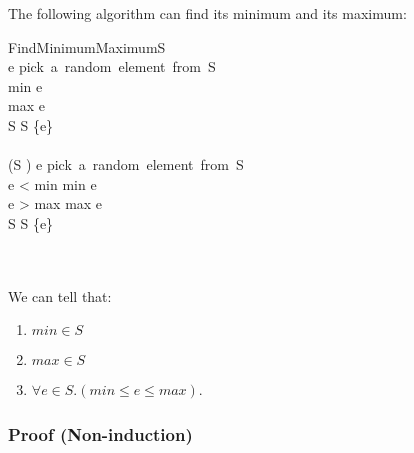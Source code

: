 \documentclass[12pt, letterpaper, oneside]{book}
\begin{document}
The following algorithm can find its minimum and its maximum:

\begin{pseudocode}[ruled]{FindMinimumMaximum}{S}
   \\
  e \GETS \mbox{pick a random element from S} \\
  min \GETS e \\
  max \GETS e \\
  S \GETS S \setminus \{e\} \\
  \\
  \WHILE (S \ne \emptyset) \DO
  \BEGIN
  e \GETS \mbox{pick a random element from S} \\
  \IF e < min \THEN min \GETS e \\
  \IF e > max \THEN max \GETS e \\
  S \GETS S \setminus \{e\} \\
  \END \\
  \\
\end{pseudocode}

We can tell that:
\begin{enumerate}
  \item $min \in S$
  \item $max \in S$
  \item $\forall e \in S. (min \leqslant e \leqslant max)$.
\end{enumerate}

\subsubsection{Proof (Non-induction)}
\end{document}
